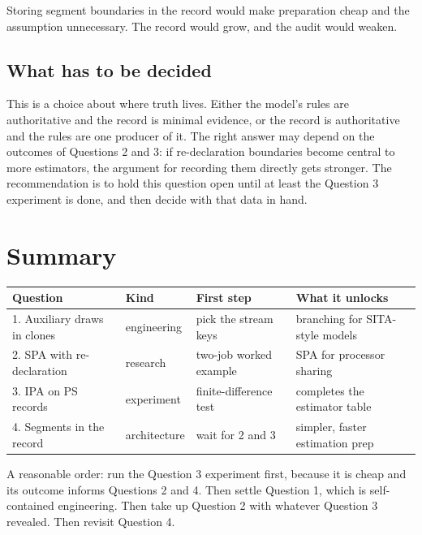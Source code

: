 \documentclass[11pt]{article}
\begin{document}
Storing segment boundaries in the record would make preparation cheap and
the assumption unnecessary. The record would grow, and the audit would
weaken.

\subsection{What has to be decided}

This is a choice about where truth lives. Either the model's rules are
authoritative and the record is minimal evidence, or the record is
authoritative and the rules are one producer of it. The right answer may
depend on the outcomes of Questions 2 and 3: if re-declaration boundaries
become central to more estimators, the argument for recording them
directly gets stronger. The recommendation is to hold this question open
until at least the Question 3 experiment is done, and then decide with
that data in hand.

\section{Summary}

\begin{center}
\small
\begin{tabular}{@{}llll@{}}
\toprule
Question & Kind & First step & What it unlocks \\
\midrule
1. Auxiliary draws in clones & engineering & pick the stream keys & branching for SITA-style models \\
2. SPA with re-declaration & research & two-job worked example & SPA for processor sharing \\
3. IPA on PS records & experiment & finite-difference test & completes the estimator table \\
4. Segments in the record & architecture & wait for 2 and 3 & simpler, faster estimation prep \\
\bottomrule
\end{tabular}
\end{center}

A reasonable order: run the Question 3 experiment first, because it is
cheap and its outcome informs Questions 2 and 4. Then settle Question 1,
which is self-contained engineering. Then take up Question 2 with whatever
Question 3 revealed. Then revisit Question 4.
\end{document}
